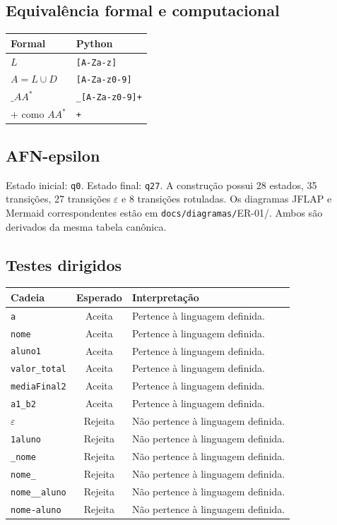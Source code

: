 \documentclass[12pt,a4paper,oneside]{report}
\begin{document}
\subsection{Equivalência formal e computacional}
\begin{center}
\small
\begin{tabular}{|p{}|p{}|}
\toprule
Formal & Python \\
\midrule
$L$ & \texttt{[A-Za-z]} \\
$A=L\cup D$ & \texttt{[A-Za-z0-9]} \\
$\_AA^*$ & \texttt{\_[A-Za-z0-9]+} \\
$+$ como $AA^*$ & \texttt{+} \\
\bottomrule
\end{tabular}
\end{center}
\subsection{AFN-epsilon}
Estado inicial: \texttt{q0}. Estado final: \texttt{q27}. A construção possui 28 estados, 35 transições, 27 transições $\varepsilon$ e 8 transições rotuladas.
Os diagramas JFLAP e Mermaid correspondentes estão em \texttt{docs/diagramas/}ER-01/. Ambos são derivados da mesma tabela canônica.
\subsection{Testes dirigidos}
\begin{center}
\small
\begin{tabular}{|p{}|c|p{}|}
\toprule
Cadeia & Esperado & Interpretação \\
\midrule
\texttt{a} & Aceita & Pertence à linguagem definida. \\
\texttt{nome} & Aceita & Pertence à linguagem definida. \\
\texttt{aluno1} & Aceita & Pertence à linguagem definida. \\
\texttt{valor\_total} & Aceita & Pertence à linguagem definida. \\
\texttt{mediaFinal2} & Aceita & Pertence à linguagem definida. \\
\texttt{a1\_b2} & Aceita & Pertence à linguagem definida. \\
$\varepsilon$ & Rejeita & Não pertence à linguagem definida. \\
\texttt{1aluno} & Rejeita & Não pertence à linguagem definida. \\
\texttt{\_nome} & Rejeita & Não pertence à linguagem definida. \\
\texttt{nome\_} & Rejeita & Não pertence à linguagem definida. \\
\texttt{nome\_\_aluno} & Rejeita & Não pertence à linguagem definida. \\
\texttt{nome-aluno} & Rejeita & Não pertence à linguagem definida. \\
\bottomrule
\end{tabular}
\end{center}
\end{document}
